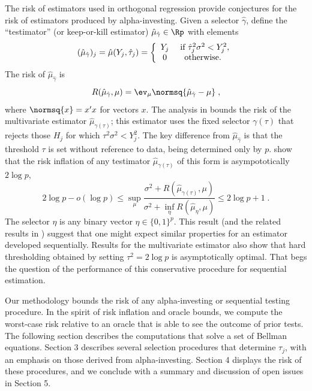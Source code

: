 \documentclass[12pt]{article}
\begin{document}
 
 The risk of estimators used in orthogonal regression provide conjectures for
 the risk of estimators produced by alpha-investing.  Given a selector
 $\hat\gamma$, define the ``testimator'' (or keep-or-kill estimator)
 $\hat\mu_{\hat\gamma} \in \Rp$ with elements
 \begin{equation}
   (\hat\mu_{\hat\gamma})_j 
          = \hat\mu(Y_j, \hat\tau_j) 
          = \left\{ \begin{array}{cc}
                                Y_j & \mbox{ if } \hat\tau_j^2 \sigma^2 < Y_j^2,  \cr
                                 0  & \mbox{ otherwise. }
                              \end{array}\right.
 \label{eq:muhat}
 \end{equation}
 The risk of $\hat\mu_{\hat\gamma}$ is
 \begin{equation}
    R(\hat\mu_{\hat\gamma}, \mu) 
      = \ev_\mu \normsq{\hat\mu_{\hat\gamma} - \mu} \;,
 \label{eq:risk}
 \end{equation}
 where $\normsq{x} = x'x$ for vectors $x$.  The analysis in
 \citet{fostergeorge94} bounds the risk of the multivariate estimator
 $\hat\mu_{\gamma(\tau)}$; this estimator uses the fixed selector $\gamma(\tau)$
 that rejects those $H_j$ for which $\tau^2 \sigma^2 < Y_j^2$.  The key
 difference from $\hat\mu_{\hat\gamma}$ is that the threshold $\tau$ is set
 without reference to data, being determined only by $p$.
  \citet{fostergeorge94} show that the risk inflation of any testimator
 $\hat\mu_{\gamma(\tau)}$ of this form is asympototically $2 \log p$,
 \begin{equation}
    2 \log p - o(\log p) 
    \le
    \sup_\mu  \frac{\sigma^2 + R(\hat\mu_{\gamma(\tau)}, \mu)}
                   {\sigma^2 + \inf_\eta{R(\hat\mu_\eta, \mu)}}  
    \le 
    2 \log p + 1 \;.
 \label{eq:ri}
 \end{equation}
 The selector $\eta$ is any binary vector $\eta \in \{0,1\}^p$.  This result
 (and the related results in \citet{donohojohnstone94}) suggest that one might
 expect similar properties for an estimator developed sequentially.  Results for
 the multivariate estimator also show that hard thresholding obtained by setting
 $\tau^2 = 2 \log p$ is asymptotically optimal.  That begs the question of the
 performance of this conservative procedure for sequential estimation.


 Our methodology bounds the risk of any alpha-investing or sequential testing
 procedure.  In the spirit of risk inflation and oracle bounds, we compute the
 worst-case risk relative to an oracle that is able to see the outcome of prior
 tests.  The following section describes the computations that solve a set of
 Bellman equations.  Section 3 describes several selection procedures that
 determine $\tau_j$, with an emphasis on those derived from alpha-investing.
  Section 4 displays the risk of these procedures, and we conclude with a
 summary and discussion of open issues in Section 5.
\end{document}
